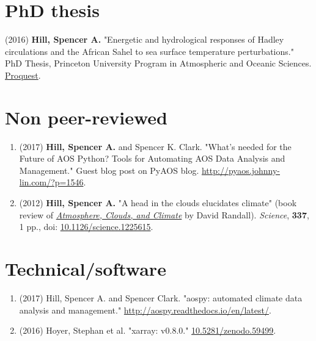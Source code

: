 \documentclass[12pt,letterpaper]{shillcv}
\begin{document}
\section*{PhD thesis}
\label{sec:orgb344135}
(2016) \textbf{Hill, Spencer A.} "Energetic and hydrological responses of Hadley
circulations and the African Sahel to sea surface temperature perturbations."
PhD Thesis, Princeton University Program in Atmospheric and Oceanic Sciences.
\href{http://search.proquest.com.ezproxy.princeton.edu/pqdtglobal/docview/1831357756/abstract/522E2D42A8BF49C0PQ/1}{Proquest}.
\section*{Non peer-reviewed}
\label{sec:orge13d2f0}
\begin{enumerate}
\item (2017) \textbf{Hill, Spencer A.} and Spencer K. Clark.  "What’s needed for the Future
of AOS Python? Tools for Automating AOS Data Analysis and Management."  Guest
blog post on PyAOS blog.  \url{http://pyaos.johnny-lin.com/?p=1546}.
\item (2012) \textbf{Hill, Spencer A.}  "A head in the clouds elucidates climate" (book
review of \href{http://press.princeton.edu/titles/9773.html}{\emph{Atmosphere, Clouds, and Climate}} by David Randall). \emph{Science}, \textbf{337},
1 pp., doi: \href{http://dx.doi.org/10.1126/science.1225615}{10.1126/science.1225615}.
\end{enumerate}
\section*{Technical/software}
\label{sec:orgfd87130}
\begin{enumerate}
\item (2017) Hill, Spencer A. and Spencer Clark.  "aospy: automated climate data
analysis and management."  \url{http://aospy.readthedocs.io/en/latest/}.
\item (2016) Hoyer, Stephan et al.  "xarray: v0.8.0."  \href{https://doi.org/10.5281/zenodo.59499}{10.5281/zenodo.59499}.
\end{enumerate}
\end{document}
